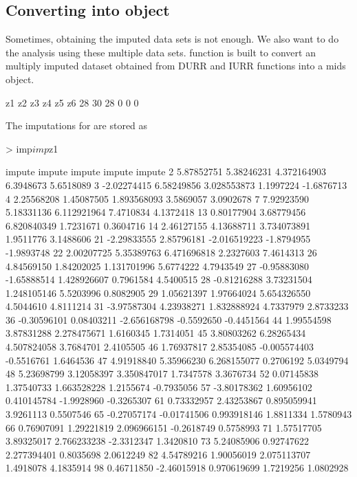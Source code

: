 \documentclass[a4paper]{article}
\begin{document}
\subsection{Converting into  object}
Sometimes, obtaining the imputed data sets is not enough. We also want to do the analysis using these multiple data sets.  function is built to convert an multiply imputed dataset obtained from DURR and IURR functions into a mids object.
\begin{Schunk}
\begin{Soutput}
z1 z2 z3 z4 z5 z6 
28 30 28  0  0  0 
\end{Soutput}
\end{Schunk}
The imputations for  are stored as
\begin{Schunk}
\begin{Sinput}
> imp$imp$z1
\end{Sinput}
\begin{Soutput}
        impute      impute       impute     impute     impute
2   5.87852751  5.38246231  4.372164903  6.3948673  5.6518089
3  -2.02274415  6.58249856  3.028553873  1.1997224 -1.6876713
4   2.25568208  1.45087505  1.893568093  3.5869057  3.0902678
7   7.92923590  5.18331136  6.112921964  7.4710834  4.1372418
13  0.80177904  3.68779456  6.820840349  1.7231671  0.3604716
14  2.46127155  4.13688711  3.734073891  1.9511776  3.1488606
21 -2.29833555  2.85796181 -2.016519223 -1.8794955 -1.9893748
22  2.00207725  5.35389763  6.471696818  2.2327603  7.4614313
26  4.84569150  1.84202025  1.131701996  5.6774222  4.7943549
27 -0.95883080 -1.65888514  1.428926607  0.7961584  4.5400515
28 -0.81216288  3.73231504  1.248105146  5.5203996  0.8082905
29  1.05621397  1.97664024  5.654326550  4.5044610  4.8111214
31 -3.97587304  4.23938271  1.832888924  4.7337979  2.8733233
36 -0.30596101  0.08403211 -2.656168798 -0.5592650 -0.4451564
44  1.99554598  3.87831288  2.278475671  1.6160345  1.7314051
45  3.80803262  6.28265434  4.507824058  3.7684701  2.4105505
46  1.76937817  2.85354085 -0.005574403 -0.5516761  1.6464536
47  4.91918840  5.35966230  6.268155077  0.2706192  5.0349794
48  5.23698799  3.12058397  3.350847017  1.7347578  3.3676734
52  0.07145838  1.37540733  1.663528228  1.2155674 -0.7935056
57 -3.80178362  1.60956102  0.410145784 -1.9928960 -0.3265307
61  0.73332957  2.43253867  0.895059941  3.9261113  0.5507546
65 -0.27057174 -0.01741506  0.993918146  1.8811334  1.5780943
66  0.76907091  1.29221819  2.096966151 -0.2618749  0.5758993
71  1.57517705  3.89325017  2.766233238 -2.3312347  1.3420810
73  5.24085906  0.92747622  2.277394401  0.8035698  2.0612249
82  4.54789216  1.90056019  2.075113707  1.4918078  4.1835914
98  0.46711850 -2.46015918  0.970619699  1.7219256  1.0802928
\end{Soutput}
\end{Schunk}
\end{document}
